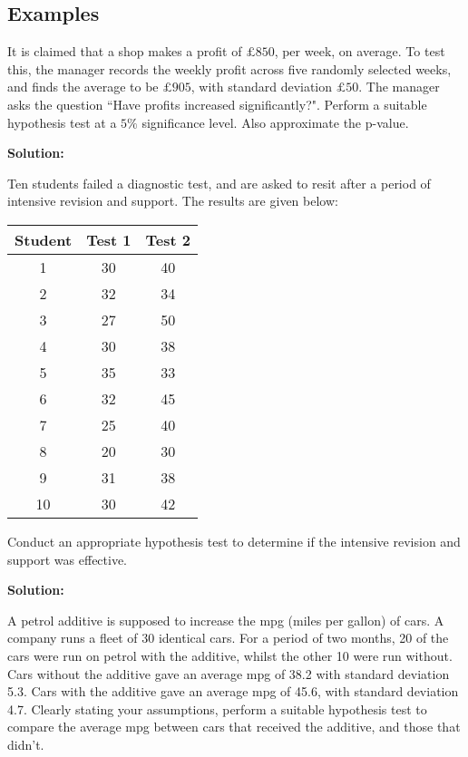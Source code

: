 \documentclass[12pt]{article}
\newenvironment{example}[1][Example:]{\begin{trivlist}
\item[\hskip \labelsep {\bfseries #1}]}{\end{trivlist}}
\begin{document}
\subsection{Examples}
\begin{example}
It is claimed that a shop makes a profit of $\pounds850$, per week, on average. To test this, the manager records the weekly profit across five randomly selected weeks, and finds the average to be $\pounds905$, with standard deviation $\pounds50$. The manager asks the question ``Have profits increased significantly?". Perform a suitable hypothesis test at a $5\%$ significance level. Also approximate the p-value.
\end{example}

\begin{mdframed}
\bf{Solution:}
\textcolor[rgb]{1.00,1.00,1.00}{\lipsum[1-4]}
\end{mdframed}

\begin{example}
Ten students failed a diagnostic test, and are asked to resit after a period of intensive revision and support. The results are given below:
\begin{center}
\begin{tabular}{|c|c|c|}
  \hline
  Student & Test 1 & Test 2 \\ \hline
  1 & 30 & 40 \\
  2 & 32 & 34 \\
  3 & 27 & 50 \\
  4 & 30 & 38 \\
  5 & 35 & 33 \\
  6 & 32 & 45 \\
  7 & 25 & 40 \\
  8 & 20 & 30 \\
  9 & 31 & 38 \\
  10 & 30 & 42 \\
  \hline
\end{tabular}
\end{center}
Conduct an appropriate hypothesis test to determine if the intensive revision and support was effective.
\end{example}

\begin{mdframed}
\bf{Solution:}
\textcolor[rgb]{1.00,1.00,1.00}{\lipsum[1-4]}
\end{mdframed}

\begin{example}
A petrol additive is supposed to increase the mpg (miles per gallon) of cars. A company runs a fleet of 30 identical cars. For a period of two months, 20 of the cars were run on petrol with the additive, whilst the other 10 were run without. Cars without the additive gave an average mpg of 38.2 with standard deviation 5.3. Cars with the additive gave an average mpg of 45.6, with standard deviation 4.7. Clearly stating your assumptions, perform a suitable hypothesis test to compare the average mpg between cars that received the additive, and those that didn't.
\end{example}
\end{document}
